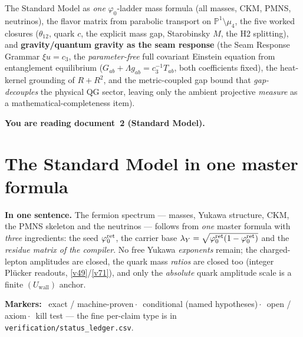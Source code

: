 
\maketitle
\vspace{-0.4cm}

\begin{keybox}
The Standard Model as \emph{one} $\varphi_0$-ladder mass formula (all masses, CKM, PMNS, neutrinos), the
flavor matrix from parabolic transport on $\mathbb P^1\setminus\mu_4$, the five worked closures
($\theta_{12}$, quark $c$, the explicit mass gap, Starobinsky $M$, the H2 splitting), and
\textbf{gravity/quantum gravity as the seam response} (the Seam Response Grammar $\xi u=c_3$, the
\emph{parameter-free} full covariant Einstein equation from entanglement equilibrium ($G_{ab}{+}\Lambda g_{ab}{=}c_3^{-1}T_{ab}$, both coefficients fixed), the
heat-kernel grounding of $R+R^2$, and the metric-coupled gap bound that \emph{gap-decouples} the physical
QG sector, leaving only the ambient projective \emph{measure} as a mathematical-completeness item).
\end{keybox}


\noindent\textbf{You are reading \textbf{document~2} (Standard Model).}


\TFPTbadges
\TFPTclaimstack[sm]


\tableofcontents
\clearpage
\part{The Standard Model in one master formula}
\par\smallskip\noindent\textbf{In one sentence.}
The fermion spectrum --- masses, Yukawa structure, CKM, the PMNS skeleton and the neutrinos --- follows
from \emph{one} master formula with \emph{three} ingredients: the seed $\varphi_0^{\mathrm{ret}}$, the carrier base
$\lambda_Y=\sqrt{\varphi_0^{\mathrm{ret}}(1-\varphi_0^{\mathrm{ret}})}$ and the \emph{residue matrix of the compiler}. No free Yukawa \emph{exponents}
remain; the charged-lepton amplitudes are closed, the quark mass \emph{ratios} are closed too (integer
Pl\"ucker readouts, \vref{v49}/\vref{v71}), and only the \emph{absolute} quark amplitude scale is a finite
$(U_{\mathrm{wall}})$ anchor.

\noindent\textbf{Markers:} \mE\ exact / machine-proven\,$\cdot$\,\mC\ conditional (named hypotheses)\,$\cdot$\,\mO\ open / axiom\,$\cdot$\,\mX\ kill test --- the fine per-claim type is in \texttt{verification/status\_ledger.csv}.

